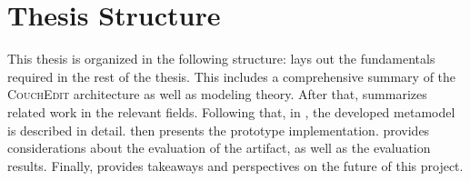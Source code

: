 \section{Thesis Structure}
This thesis is organized in the following structure:  lays out the fundamentals required in the rest of the thesis. This includes a comprehensive summary of the \textsc{CouchEdit} architecture as well as modeling theory. After that,  summarizes related work in the relevant fields. Following that, in , the developed metamodel is described in detail.  then presents the prototype implementation.  provides considerations about the evaluation of the artifact, as well as the evaluation results. Finally,  provides takeaways and perspectives on the future of this project.